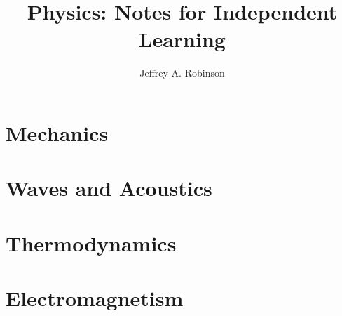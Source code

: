 \documentclass[oneside]{book}
\title{Physics: Notes for Independent Learning}
\author{Jeffrey A. Robinson}
\theoremstyle{definition}
\begin{document}
\frontmatter

\maketitle
\tableofcontents

\mainmatter

\part{Mechanics}















\part{Waves and Acoustics}



\part{Thermodynamics}





\part{Electromagnetism}












\end{document}
